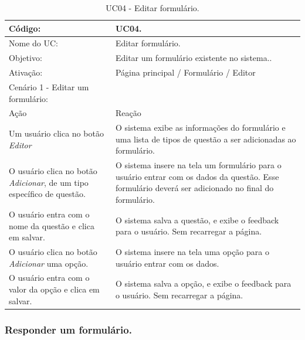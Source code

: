 \documentclass[11pt]{article}
\begin{document}
        \begin{table}[h]
          \begin{center}
            \begin{tabular}{ | p{7cm} | p{8cm} | }
              \hline
              Código: \cellcolor{gray} & UC04. \\
              \hline
              Nome do UC: \cellcolor{gray} & Editar formulário. \\
              \hline
              Objetivo: \cellcolor{gray} & Editar um formulário existente no sistema.. \\
              \hline
              Ativação: \cellcolor{gray} & Página principal / Formulário / Editor \\
              \hline
              \hline
              Cenário 1 - Editar um formulário: &  \\
              \hline
              Ação\cellcolor{gray} & Reação\cellcolor{gray} \\
              \hline
              Um usuário clica no botão {\em Editor} & O sistema exibe as informações do formulário e uma lista de tipos de questão a ser adicionadas ao formulário. \\
              \hline
              O usuário clica no botão {\em Adicionar}, de um tipo específico de questão. & O sistema insere na tela um formulário para o usuário entrar com os dados da questão. Esse formulário deverá ser adicionado no final do formulário. \\
              \hline
              O usuário entra com o nome da questão e clica em salvar. & O sistema salva a questão, e exibe o feedback para o usuário. Sem recarregar a página. \\
              \hline
              O usuário clica no botão {\em Adicionar} uma opção. & O sistema insere na tela uma opção para o usuário entrar com os dados. \\
              \hline
              O usuário entra com o valor da opção e clica em salvar. & O sistema salva a opção, e exibe o feedback para o usuário. Sem recarregar a página. \\
              \hline
            \end{tabular}
            \caption{UC04 - Editar formulário.}
          \end{center}
        \end{table}

    \clearpage
      
      \subsubsection{Responder um formulário.}
\end{document}
